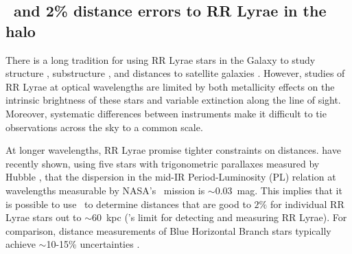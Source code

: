 \subsection{\spitzer\ and 2\% distance errors to RR Lyrae in the halo}
\label{sec:ch2-spitzer}

There is a long tradition for using RR Lyrae stars in the Galaxy to study
structure \citep[e.g.,][]{shapley18}, substructure \citep[e.g.,][]{sesar10}, and
distances to satellite galaxies \citep[e.g.,][]{clementini03}. However, studies
of RR Lyrae at optical wavelengths are limited by both metallicity effects on
the intrinsic brightness of these stars and variable extinction along the line
of sight.  Moreover, systematic differences between instruments make it
difficult to tie observations across the sky to a common scale.

At longer wavelengths, RR Lyrae promise tighter constraints on distances.
\citet{madore12} have recently shown, using five stars with trigonometric
parallaxes measured by Hubble \citep{benedict11}, that the dispersion in the
mid-IR Period-Luminosity (PL) relation \citep[first mapped by][]{longmore86} at
wavelengths measurable by NASA's \spitzer\ mission is $\sim$0.03~mag. This
implies that it is possible to use \spitzer\ to determine distances that are
good to $2\%$ for individual RR Lyrae stars out to $\sim$60~kpc (\spitzer's
limit for detecting and measuring RR Lyrae). For comparison, distance
measurements of Blue Horizontal Branch stars typically achieve $\sim$10-15\%
uncertainties  \citep[if appropriate color measurements are available,
e.g.,][]{deason12b}.

